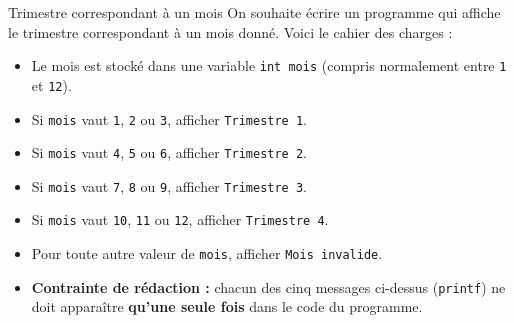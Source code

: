 \begin{UPSTIexercice}{Trimestre correspondant à un mois}
    On souhaite écrire un programme qui affiche le trimestre correspondant à un mois donné. Voici le cahier des charges :
    \begin{itemize}
        \item Le mois est stocké dans une variable \texttt{int mois} (compris normalement entre \texttt{1} et \texttt{12}).
        \item Si \texttt{mois} vaut \texttt{1}, \texttt{2} ou \texttt{3}, afficher \texttt{Trimestre 1}.
        \item Si \texttt{mois} vaut \texttt{4}, \texttt{5} ou \texttt{6}, afficher \texttt{Trimestre 2}.
        \item Si \texttt{mois} vaut \texttt{7}, \texttt{8} ou \texttt{9}, afficher \texttt{Trimestre 3}.
        \item Si \texttt{mois} vaut \texttt{10}, \texttt{11} ou \texttt{12}, afficher \texttt{Trimestre 4}.
        \item Pour toute autre valeur de \texttt{mois}, afficher \texttt{Mois invalide}.
        \item \textbf{Contrainte de rédaction :} chacun des cinq messages ci-dessus (\texttt{printf}) ne doit apparaître \textbf{qu'une seule fois} dans le code du programme.
    \end{itemize}
\end{UPSTIexercice}

